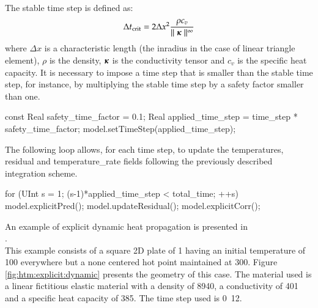 The stable time step is defined as:
\begin{equation}\label{eqn:smm:explicit:stabletime}
  \Delta t_{{\mathrm{crit}}} = 2 \Delta x^2 \frac{\rho c_v}{\mid\mid \boldsymbol{\kappa} \mid\mid^\infty}
\end{equation}
where $\Delta  x$ is a  characteristic length (\eg  the inradius in the  case of
linear triangle  element), $\rho$ is the density, $\boldsymbol{\kappa}$ is the conductivity tensor
and $c_v$ is the specific heat capacity. It is
necessary to impose a  time step that is smaller than the  stable time step, for
instance, by  multiplying the stable time  step by a safety  factor smaller than
one.

\begin{cpp}
  const Real safety_time_factor = 0.1;
  Real applied_time_step = time_step * safety_time_factor;
  model.setTimeStep(applied_time_step);
\end{cpp}


The following loop  allows, for each time  step, to update the  temperatures, residual and
temperature\_rate  fields  following the previously described integration scheme.

\begin{cpp}
  for (UInt s = 1; (s-1)*applied_time_step < total_time; ++s) {
    model.explicitPred();
    model.updateResidual();
    model.explicitCorr();  
  }
\end{cpp}

An    example    of    explicit     dynamic    heat propagation is    presented    in \\
.  \\
This example  consists of a square 2D plate of \unit{1}{\squaremetre} 
having an initial temperature of \unit{100}{\kelvin} everywhere but a none centered hot point 
maintained at \unit{300}{\kelvin}. Figure \ref{fig:htm:explicit:dynamic} presents the
geometry of this case. The material used is a linear fictitious elastic material
with  a density  of  \unit{8940}{\kilogrampercubicmetre}, a  conductivity of 
\unit{401}{\watt\per\metre\per\kelvin} and a specific heat capacity of \unit{385}{\joule\per\kelvin\per\kilogram}. The time step used is \unit{0.12}{\second}.

